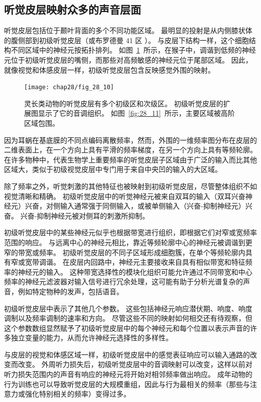 \subsection{听觉皮层映射众多的声音层面}

听觉皮层包括位于颞叶背面的多个不同功能区域。
最明显的投射是从内侧膝状体的腹侧部到初级听觉皮层（或布罗德曼 41 区 ）。
与皮层下结构一样，这个细胞结构不同区域中的神经元按拓扑排列。
如图~\ref{fig:28_10}~所示，在猴子中，调谐到低频的神经元位于初级听觉皮层的嘴侧，而那些对高频敏感的神经元位于尾部区域。
因此，就像视觉和体感皮层一样，初级听觉皮层包含反映感觉外围的映射。


\begin{figure}[htbp]
	\centering
	\texttt{[image: chap28/fig\_28\_10]}
	\caption{灵长类动物的听觉皮层有多个初级区和次级区。 
		初级听觉皮层的扩展图显示了它的音调组织。
		如图~\ref{fig:28_11}~所示，主要区域被高阶区域包围。}
	\label{fig:28_10}
\end{figure}


因为耳蜗在基底膜的不同点编码离散频率，然而，外围的一维频率图分布在皮层的二维表面上，在一个方向上具有平滑的频率梯度，在另一个方向上具有等频轮廓。
在许多物种中，代表生物学上重要频率的听觉皮层子区域由于广泛的输入而比其他区域大，类似于初级视觉皮层中专门用于来自中央凹的输入的大区域。


除了频率之外，听觉刺激的其他特征也被映射到初级听觉皮层，尽管整体组织不如视觉清晰和精确。
初级听觉皮层中的听觉神经元被来自双耳的输入（双耳兴奋神经元）兴奋，对侧输入通常强于同侧输入，或被单侧输入（兴奋-抑制神经元）兴奋。
兴奋-抑制神经元被对侧耳的刺激所抑制。


初级听觉皮层中的某些神经元似乎也根据带宽进行组织，即根据它们对窄或宽频率范围的响应。
与远离中心的神经元相比，靠近等频轮廓中心的神经元被调谐到更窄的带宽或频率。
初级听觉皮层的不同子区域形成细胞簇，在单个等频轮廓内具有窄或宽带调谐。
在皮层内回路中，神经元主要接收来自具有相似带宽和特征频率的神经元的输入。
这种带宽选择性的模块化组织可能允许通过不同带宽和中心频率的神经元滤波器对输入信号进行冗余处理，这可能有助于分析光谱复杂的声音，例如特定物种的发声，包括语音。


初级听觉皮层中表示了其他几个参数。
这些包括神经元响应潜伏期、响度、响度调制以及频率调制的速率和方向。
尽管这些不同的映射如何相交还有待观察，但这个参数数组显然赋予了初级听觉皮层中的每个神经元和每个位置以表示声音的许多独立变量的能力，从而允许神经元选择性的多样性。


与皮层的视觉和体感区域一样，初级听觉皮层中的感觉表征响应可以输入通路的改变而改变。
外周听力损失后，初级听觉皮层中的音调映射可以改变，这样以前对听力损失范围内的声音有响应的神经元将开始对相邻频率做出响应。
成年动物的行为训练也可以导致听觉皮层的大规模重组，因此与行为最相关的频率（那些与注意力或强化特别相关的频率）变得过多\cite{zhang2001persistent,merzenich1975representation}。


